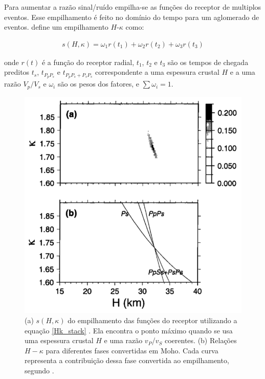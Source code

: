 Para aumentar a razão sinal/ruído empilha-se as funções do receptor de multiplos eventos. Esse empilhamento é feito no domínio do tempo para um aglomerado de eventos. \cite{Zhu_Kanamori_2000} define um empilhamento $H$-$\kappa$ como:

\begin{eqnarray} \label{Hk_stack}
s(H,\kappa) = \omega_{1}r(t_{1}) + \omega_{2}r(t_{2}) + \omega_{3}r(t_{3})
\end{eqnarray}

onde $r(t)$ é a função do receptor radial, $t_{1}$, $t_{2}$ e $t_{3}$ são os tempos de chegada preditos  $t_{s}$,  $t_{P_{p}P_{s}}$ e  $t_{P_{p}P_{s}+P_{s}P_{s}}$ correspondente a uma espessura crustal $H$ e a uma razão $V_{p}/V_{s}$ e $\omega_{i}$ são os pesos dos fatores, e $\sum \omega_{i} = 1$. 

\begin{figure}[!ht]
\centering
\includegraphics[scale=0.3]{Figs/grid_search.png}
\caption[a) $s(H,\kappa)$ do empilhamento das funções do receptor utilizando a equação \ref{Hk_stack}.(b) Relações $H-\kappa$ para diferentes fases convertidas em Moho.]{(a) $s(H,\kappa)$ do empilhamento das funções do receptor utilizando a equação \ref{Hk_stack} . Ela encontra o ponto máximo quando se usa uma espessura crustal $H$ e uma razão $v_{P}$/$v_{S}$ coerentes. (b) Relações $H-\kappa$ para diferentes fases convertidas em Moho. Cada curva representa a contribuição dessa fase convertida ao empilhamento, segundo \cite{Zhu_Kanamori_2000}.}
\label{grid_search}
\end{figure}


